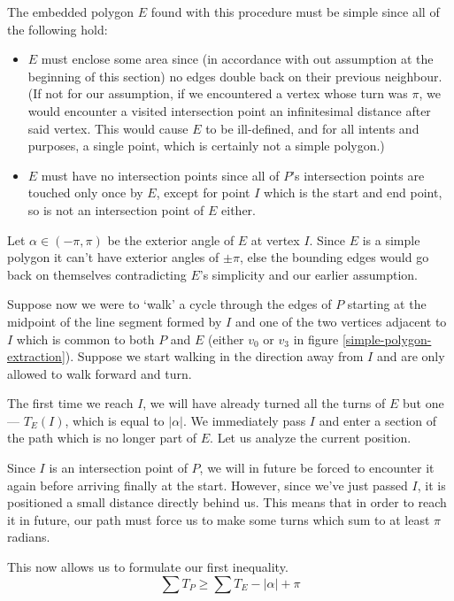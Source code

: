 \documentclass{article}
\begin{document}
The embedded polygon \(E\) found with this procedure must be simple since all of the following hold:
\begin{itemize}
	\item
		\(E\) must enclose some area since (in accordance with out assumption at the beginning of this section) no edges double back on their previous neighbour. (If not for our assumption, if we encountered a vertex whose turn was \(\pi\), we would encounter a visited intersection point an infinitesimal distance after said vertex. This would cause \(E\) to be ill-defined, and for all intents and purposes, a single point, which is certainly not a simple polygon.)

	\item
		\(E\) must have no intersection points since all of \(P\)'s intersection points are touched only once by \(E\), except for point \(I\) which is the start and end point, so is not an intersection point of \(E\) either.
\end{itemize}

Let \(\alpha \in (-\pi, \pi)\) be the exterior angle of \(E\) at vertex \(I\). Since \(E\) is a simple polygon it can't have exterior angles of \(\pm\pi\), else the bounding edges would go back on themselves contradicting \(E\)'s simplicity and our earlier assumption.

Suppose now we were to `walk' a cycle through the edges of \(P\) starting at the midpoint of the line segment formed by \(I\) and one of the two vertices adjacent to \(I\) which is common to both \(P\) and \(E\) (either \(v_0\) or \(v_3\) in figure \ref{simple-polygon-extraction}). Suppose we start walking in the direction away from \(I\) and are only allowed to walk forward and turn.

The first time we reach \(I\), we will have already turned all the turns of \(E\) but one --- \(T_E(I)\), which is equal to \(|\alpha|\). We immediately pass \(I\) and enter a section of the path which is no longer part of \(E\). Let us analyze the current position.

Since \(I\) is an intersection point of \(P\), we will in future be forced to encounter it again before arriving finally at the start. However, since we've just passed \(I\), it is positioned a small distance directly behind us. This means that in order to reach it in future, our path must force us to make some turns which sum to at least \(\pi\) radians.

This now allows us to formulate our first inequality.
\begin{equation}
	\sum T_P \geq \sum T_E - |\alpha| + \pi \label{ineq-1}
\end{equation}
\end{document}

